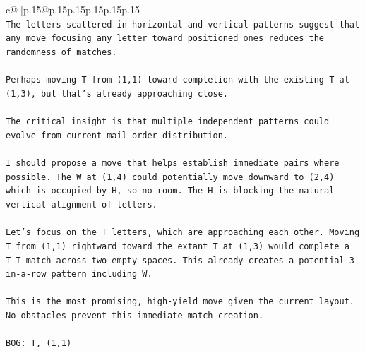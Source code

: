 \documentclass{article}
\begin{document}
{\begin{supertabular}{c@{$\;$}|p{.15\linewidth}@{}p{.15\linewidth}p{.15\linewidth}p{.15\linewidth}p{.15\linewidth}p{.15\linewidth}}
{{{\\ 
\texttt{The letters scattered in horizontal and vertical patterns suggest that any move focusing any letter toward positioned ones reduces the randomness of matches.} \\
\\ 
\texttt{Perhaps moving T from (1,1) toward completion with the existing T at (1,3), but that's already approaching close.} \\
\\ 
\texttt{The critical insight is that multiple independent patterns could evolve from current mail{-}order distribution.} \\
\\ 
\texttt{I should propose a move that helps establish immediate pairs where possible. The W at (1,4) could potentially move downward to (2,4) which is occupied by H, so no room. The H is blocking the natural vertical alignment of letters.} \\
\\ 
\texttt{Let's focus on the T letters, which are approaching each other. Moving T from (1,1) rightward toward the extant T at (1,3) would complete a T{-}T match across two empty spaces. This already creates a potential 3{-}in{-}a{-}row pattern including W.} \\
\\ 
\texttt{This is the most promising, high{-}yield move given the current layout. No obstacles prevent this immediate match creation.} \\
\\ 
\texttt{BOG: T, (1,1)} \\
            }
        }
    }
     \\ \\


\end{supertabular}}
\end{document}
